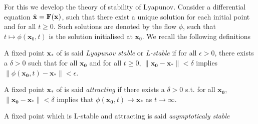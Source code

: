 \begin{comment}
 We propose here to fix things, we will check numerically for the example and see that even the numerical expression isn't simple. Let's say $F(B)=B$, $G(\P)=\P^2$ and fix arbitrary the parameters making attention to $\a\d>\g\m$. Let's say $\a=4$, $\b=5$, $\m=2$, $\g=1$, $\d=3$, $\n=6$.
We get then $\Bstar=F(\Bstar)
= (5\times1+6\times4)/(5\times3+6\times2)
= 29/27$, 
$F'(\Bstar)=1$, 
$\Pstar^2=G(\Pstar)
= (4\times3-1\times2)/(5\times3+6\times2)
= 10/27$, 
$G'(\Pstar)=2\Pstar=2\sqrt{10/27}$. The matrix is then
$$ \begin{pmatrix}
     - 29/27*2 & -29/27*5*2\sqrt{10/27}
    \\
    10/27*3   & -10/27*6*2\sqrt{10/27}
\end{pmatrix} 
= \begin{pmatrix}
    -58/27 & -290 \sqrt{10/3}/81 \\ 10/9 & -40\sqrt{10/3}/27
\end{pmatrix} 
$$
with the eigenvalues 
$$\l_1=\frac{1}{243} \big(-3 (87 + 20 \sqrt{30}) + 3 i \sqrt{3 (-6523 + 4060 \sqrt{30})}\big) 
\quad \text{ and } \quad \l_2=\bar{\l}_1.$$
We have then an stable linearized system
\end{comment}
For this we develop the theory of stability of Lyapunov. Consider a differential equation $\dot{\mathbf{x}}=\mathbf{F}(\mathbf{x})$, such that there exist a unique solution for each initial point and for all $t\geq0$. Such solutions are denoted by the flow $\phi$, such that $t\mapsto \phi(\mathbf{x}_0,t)$ is the solution initialised at $\mathbf{x}_0$. We recall the following definitions

\begin{definition}
 A fixed point $\mathbf{x}_*$ of  is said \emph{Lyapunov stable} or \emph{L-stable} if 
 for all $\epsilon>0$, there exists a $\delta>0$ such that for all $\mathbf{x_0}$ and for all $t\geq0$, $\|\mathbf{x_0} - \mathbf{x}_*\| < \delta$ implies $\|\phi(\mathbf{x_0},t) - \mathbf{x}_*\| < \epsilon$.
\end{definition}

\begin{definition}
A fixed point $\mathbf{x}_*$ of  is said \emph{attracting} if there exists a $\delta>0$ s.t. for all $\mathbf{x_0}$, $\|\mathbf{x_0} - \mathbf{x}_*\| < \delta$ implies that $\phi(\mathbf{x_0},t) \to \mathbf{x}_*$ as $t \to\infty$.
\end{definition}

\begin{definition}
    A fixed point which is L-stable and attracting is said \emph{asymptoticaly stable}
\end{definition}

